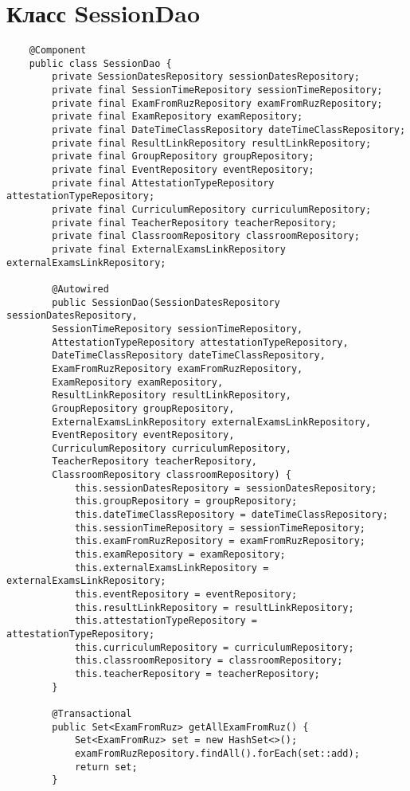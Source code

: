 \chapter{Класс SessionDao}\label{appendix-dao}	

\begin{lstlisting}
	@Component
	public class SessionDao {
		private SessionDatesRepository sessionDatesRepository;
		private final SessionTimeRepository sessionTimeRepository;
		private final ExamFromRuzRepository examFromRuzRepository;
		private final ExamRepository examRepository;
		private final DateTimeClassRepository dateTimeClassRepository;
		private final ResultLinkRepository resultLinkRepository;
		private final GroupRepository groupRepository;
		private final EventRepository eventRepository;
		private final AttestationTypeRepository attestationTypeRepository;
		private final CurriculumRepository curriculumRepository;
		private final TeacherRepository teacherRepository;
		private final ClassroomRepository classroomRepository;
		private final ExternalExamsLinkRepository externalExamsLinkRepository;
		
		@Autowired
		public SessionDao(SessionDatesRepository sessionDatesRepository,
		SessionTimeRepository sessionTimeRepository,
		AttestationTypeRepository attestationTypeRepository,
		DateTimeClassRepository dateTimeClassRepository,
		ExamFromRuzRepository examFromRuzRepository,
		ExamRepository examRepository,
		ResultLinkRepository resultLinkRepository,
		GroupRepository groupRepository,
		ExternalExamsLinkRepository externalExamsLinkRepository,
		EventRepository eventRepository,
		CurriculumRepository curriculumRepository,
		TeacherRepository teacherRepository,
		ClassroomRepository classroomRepository) {
			this.sessionDatesRepository = sessionDatesRepository;
			this.groupRepository = groupRepository;
			this.dateTimeClassRepository = dateTimeClassRepository;
			this.sessionTimeRepository = sessionTimeRepository;
			this.examFromRuzRepository = examFromRuzRepository;
			this.examRepository = examRepository;
			this.externalExamsLinkRepository = externalExamsLinkRepository;
			this.eventRepository = eventRepository;
			this.resultLinkRepository = resultLinkRepository;
			this.attestationTypeRepository = attestationTypeRepository;
			this.curriculumRepository = curriculumRepository;
			this.classroomRepository = classroomRepository;
			this.teacherRepository = teacherRepository;
		}
		
		@Transactional
		public Set<ExamFromRuz> getAllExamFromRuz() {
			Set<ExamFromRuz> set = new HashSet<>();
			examFromRuzRepository.findAll().forEach(set::add);
			return set;
		}
		

\end{lstlisting}
